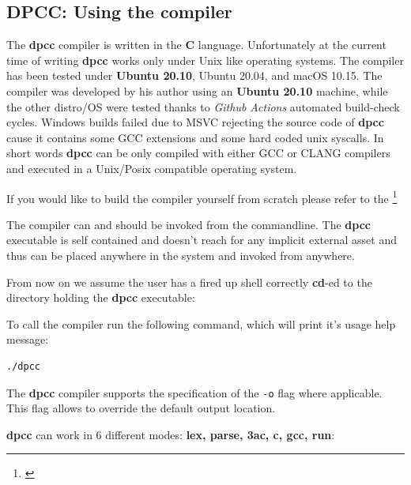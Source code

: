 \documentclass[a4paper]{article}
\newcommand{\urlref}[3][blue]{\href{#2}{\color{#1}{#3}}}%
\begin{document}
\subsection{DPCC: Using the compiler}

The \textbf{dpcc} compiler is written in the \textbf{C} language. Unfortunately at the current time
of writing \textbf{dpcc} works only under Unix like operating systems. The compiler has
been tested under \textbf{Ubuntu 20.10}, Ubuntu 20.04, and macOS 10.15. The
compiler was developed by his author using an \textbf{Ubuntu 20.10} machine, while the other distro/OS
were tested thanks to \emph{Github Actions} automated build-check cycles. Windows builds
failed due to MSVC rejecting the source code of \textbf{dpcc} cause it contains some GCC
extensions and some hard coded unix syscalls.
In short words \textbf{dpcc} can be only compiled with either GCC or CLANG compilers
and executed in a Unix/Posix compatible operating system.

If you would like to build the compiler yourself from scratch please refer to the \urlref{https://github.com/dparo/dpcc/wiki}{Project WIKI}\footnote{\urlref{https://github.com/dparo/dpcc}{Github Repo Link}}

The compiler can and should be invoked from the commandline. The \textbf{dpcc} executable
is self contained and doesn't reach for any implicit external asset and thus can be placed
anywhere in the system and invoked from anywhere.

From now on we assume the user has a fired up shell correctly \textbf{cd}-ed to the directory
holding the \textbf{dpcc} executable:

To call the compiler run the following command, which will print it's usage help message:

\begin{lstlisting}[language=Bash]
./dpcc
\end{lstlisting}

The \textbf{dpcc} compiler supports the specification of the \texttt{-o} flag
where applicable. This flag allows to override the default output location.

\textbf{dpcc} can work in 6 different modes: \textbf{lex, parse, 3ac, c, gcc, run}:
\end{document}
